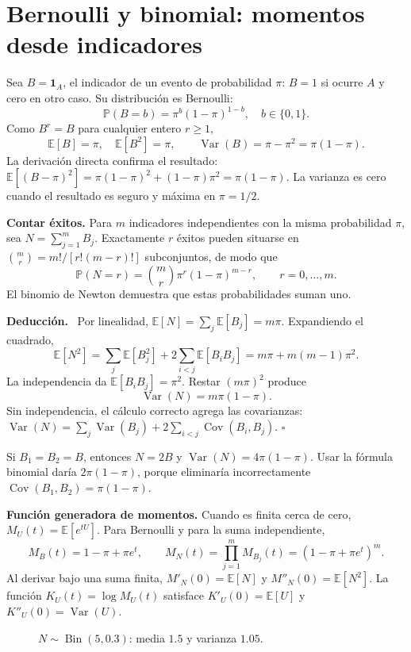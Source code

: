 \documentclass[11pt,a4paper]{article}
\newcommand{\E}{\mathbb E}
\newcommand{\Prob}{\mathbb P}
\newcommand{\ind}{\mathbf 1}
\DeclareMathOperator{\Var}{Var}
\DeclareMathOperator{\Cov}{Cov}
\newcommand{\topic}[2]{\clearpage\section{#1}\label{#2}}
\newenvironment{deduccion}{\par\textbf{Deducción.}\ }{\hfill$\square$\par}
\theoremstyle{definition}\newtheorem{definicion}[teorema]{Definición}
\begin{document}
\topic{Bernoulli y binomial: momentos desde indicadores}{s02}
Sea $B=\ind_A$, el indicador de un evento de probabilidad $\pi$:
$B=1$ si ocurre $A$ y cero en otro caso. Su distribución es Bernoulli:
\[
\Prob(B=b)=\pi^b(1-\pi)^{1-b},\quad b\in\{0,1\}.
\]
Como $B^r=B$ para cualquier entero $r\ge1$,
\[
\E[B]=\pi,\quad \E[B^2]=\pi,\qquad
\Var(B)=\pi-\pi^2=\pi(1-\pi).
\]
La derivación directa confirma el resultado:
$\E[(B-\pi)^2]=\pi(1-\pi)^2+(1-\pi)\pi^2=\pi(1-\pi)$.
La varianza es cero cuando el resultado es seguro y máxima en $\pi=1/2$.

\textbf{Contar éxitos.} Para $m$ indicadores independientes con la misma
probabilidad $\pi$, sea $N=\sum_{j=1}^m B_j$. Exactamente $r$ éxitos pueden
situarse en $\binom mr=m!/[r!(m-r)!]$ subconjuntos, de modo que
\[
\Prob(N=r)=\binom mr\pi^r(1-\pi)^{m-r},\qquad r=0,\ldots,m.
\]
El binomio de Newton demuestra que estas probabilidades suman uno.

\begin{deduccion}
Por linealidad, $\E[N]=\sum_j\E[B_j]=m\pi$. Expandiendo el cuadrado,
\[
\E[N^2]=\sum_j\E[B_j^2]+2\sum_{i<j}\E[B_iB_j]
=m\pi+m(m-1)\pi^2.
\]
La independencia da $\E[B_iB_j]=\pi^2$. Restar $(m\pi)^2$ produce
\[
\boxed{\Var(N)=m\pi(1-\pi)}.
\]
Sin independencia, el cálculo correcto agrega las covarianzas:
$\Var(N)=\sum_j\Var(B_j)+2\sum_{i<j}\Cov(B_i,B_j)$.
\end{deduccion}

\begin{ejemplo}
Si $B_1=B_2=B$, entonces $N=2B$ y $\Var(N)=4\pi(1-\pi)$.
Usar la fórmula binomial daría $2\pi(1-\pi)$, porque eliminaría
incorrectamente $\Cov(B_1,B_2)=\pi(1-\pi)$.
\end{ejemplo}
\textbf{Función generadora de momentos.} Cuando es finita cerca de cero,
$M_U(t)=\E[e^{tU}]$. Para Bernoulli y para la suma independiente,
\[
M_B(t)=1-\pi+\pi e^t,\qquad
M_N(t)=\prod_{j=1}^mM_{B_j}(t)=(1-\pi+\pi e^t)^m.
\]
Al derivar bajo una suma finita, $M'_N(0)=\E[N]$ y
$M''_N(0)=\E[N^2]$. La función $K_U(t)=\log M_U(t)$ satisface
$K'_U(0)=\E[U]$ y $K''_U(0)=\Var(U)$.
\begin{figure}[H]\centering
{}
\caption{$N\sim\operatorname{Bin}(5,0.3)$: media $1.5$ y varianza $1.05$.}
\end{figure}
\end{document}
